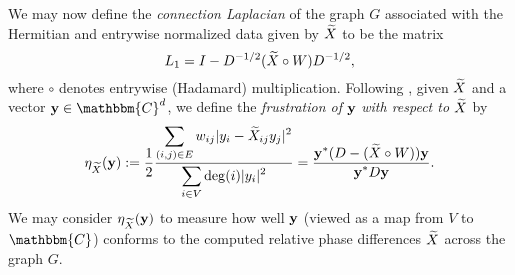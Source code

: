 
We may now define the \emph{connection Laplacian} of the graph $G$ associated with the Hermitian and entrywise normalized data given by $\widetilde{X}$ to be the matrix 
\begin{equation}
L_1 = I - D^{-1/2} (\widetilde{X} \circ W) D^{-1/2},
\label{equ:ConnectLaplace}
\end{equation}
where $\circ$ denotes entrywise (Hadamard) multiplication.
Following \cite{Cheeger}, given $\widetilde{X}$ and a vector $\y \in \mathbbm{C}^d$, we  define the \emph{frustration of} $\mathbf y$ \emph{with respect to} $\widetilde{X}$ by \begin{equation} \eta_{\widetilde{X}}(\mathbf y) := \frac{\displaystyle 1}{\displaystyle 2}\frac{\displaystyle \sum_{(i, j) \in E} w_{ij}|y_i - \widetilde{X}_{ij} y_j |^2}{\displaystyle \sum_{i \in V} \deg(i) |y_i|^2} = \frac{\displaystyle \mathbf y^* (D - (\widetilde{X} \circ W)) \mathbf y}{\displaystyle \mathbf y^* D \mathbf y}. \label{eq:frustration} \end{equation}
We may consider $\eta_{\widetilde{X}}(\mathbf y)$ to measure how well $\mathbf y$ (viewed as a map from $V$ to $\mathbbm{C}$) conforms to the computed relative phase differences $\widetilde{X}$ across the graph $G$. %

%

